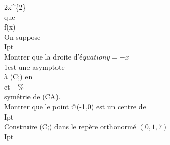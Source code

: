 
\begin{exercice}[Algèbre]
\label{ex:5}

2x^\{2\}\\
que\\
f(x) =\\
On suppose\\
Ipt\\
Montrer que la droite d'é$quation y = -x$\\
1est une asymptote\\
à (C;) en\\
et +\%\\
symétrie de (CA).\\
Montrer que le point @(-1,0) est un centre de\\
Ipt\\
Construire (C;) dans le repère orthonormé $(0, 1,7 )$\\
Ipt\\

\end{exercice}

